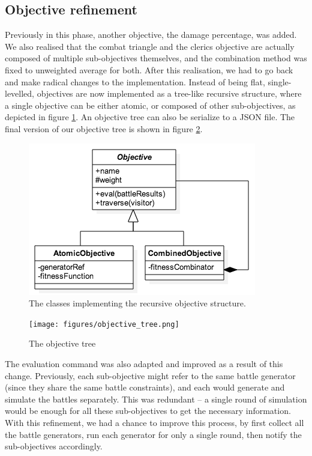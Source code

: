 \subsection{Objective refinement}

Previously in this phase, another objective, the damage percentage, was added. We also realised that the combat triangle and the clerics objective are actually composed of multiple sub-objectives themselves, and the combination method was fixed to unweighted average for both. After this realisation, we had to go back and make radical changes to the implementation. Instead of being flat, single-levelled, objectives are now implemented as a tree-like recursive structure, where a single objective can be either atomic, or composed of other sub-objectives, as depicted in figure \ref{fig:objective_uml}. An objective tree can also be serialize to a JSON file. The final version of our objective tree is shown in figure \ref{fig:objectivetree}.

\begin{figure}
	\centering
	\includegraphics[width=0.7\linewidth]{figures/uml_objectives.png}
	\caption{The classes implementing the recursive objective structure.}
	\label{fig:objective_uml}
\end{figure}

\begin{figure}
	\centering
	\texttt{[image: figures/objective\_tree.png]}
	\caption{The objective tree}
	\label{fig:objectivetree}
\end{figure}

The evaluation command was also adapted and improved as a result of this change. Previously, each sub-objective might refer to the same battle generator (since they share the same battle constraints), and each would generate and simulate the battles separately. This was redundant -- a single round of simulation would be enough for all these sub-objectives to get the necessary information. With this refinement, we had a chance to improve this process, by first collect all the battle generators, run each generator for only a single round, then notify the sub-objectives accordingly.

